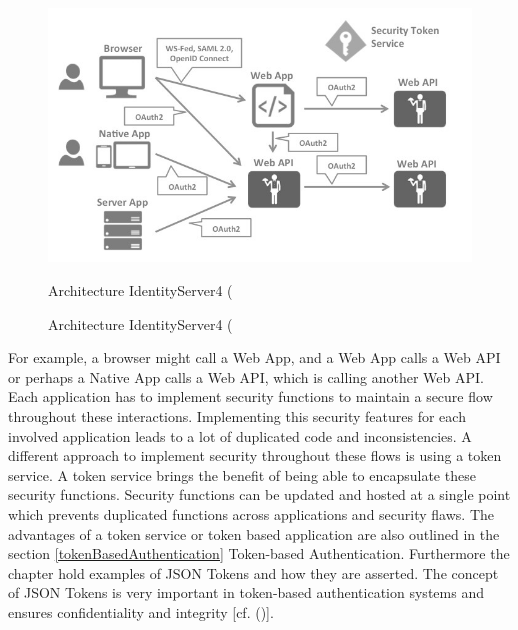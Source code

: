 \begin{figure}[h]
	\centering
	\includegraphics[width=0.9\linewidth]{images/architecture-identityserver}
	\caption[Architecture IdentityServer4]{Architecture IdentityServer4 (\cite{Brock:2018:ID4}}
	\caption{Architecture IdentityServer4 (\cite{Brock:2018:ID4}}
	\label{fig:architecture-identityserver}
\end{figure}



For example, a browser might call a Web App, and a Web App calls a Web API or perhaps a Native App calls a Web API, which is calling another Web API. Each application has to implement security functions to maintain a secure flow throughout these interactions. Implementing this security features for each involved application leads to a lot of duplicated code and inconsistencies. A different approach to implement security throughout these flows is using a token service. A token service brings the benefit of being able to encapsulate these security functions. Security functions can be updated and hosted at a single point which prevents duplicated functions across applications and security flaws. The advantages of a token service or token based application are also outlined in the section \ref{tokenBasedAuthentication} Token-based Authentication. Furthermore the chapter hold examples of JSON Tokens and how they are asserted. The concept of JSON Tokens is very important in token-based authentication systems and ensures confidentiality and integrity [cf. (\cite{Sakimura:2014:OpenIDConnect})].



